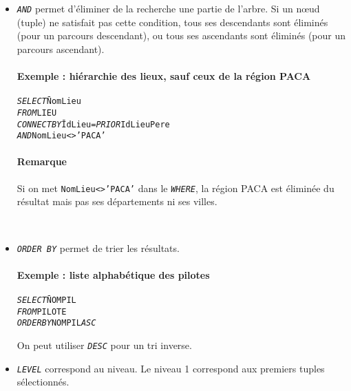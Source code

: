 \documentclass[10pt]{article}
\begin{document}
\begin{itemize}
					\item \emph{\texttt{AND}} permet d'éliminer de la recherche une partie de l'arbre. Si un nœud (tuple) ne satisfait pas cette condition, tous ses descendants sont éliminés (pour un parcours descendant), ou tous ses ascendants sont éliminés (pour un parcours ascendant).
						
						\paragraph{Exemple : hiérarchie des lieux, sauf ceux de la région PACA}
							\begin{alltt}
								\begin{tabbing}
									\emph{SELECT} \=NomLieu\\
									\emph{FROM} \>LIEU\\
									\emph{CONNECT BY} \=IdLieu=\emph{PRIOR} IdLieuPere\\
													\>\emph{AND} NomLieu<>'PACA'
								\end{tabbing}
							\end{alltt}
						\paragraph{Remarque} Si on met \texttt{NomLieu<>'PACA'} dans le \emph{\texttt{WHERE}}, la région PACA est éliminée du résultat mais pas ses départements ni ses villes.
						
						~\\
					\item \emph{\texttt{ORDER BY}} permet de trier les résultats.\index{ORDER BY}
						\paragraph{Exemple : liste alphabétique des pilotes}
							\begin{alltt}
								\begin{tabbing}
									\emph{SELECT} \=NOMPIL\\
									\emph{FROM}\>PILOTE\\
									\emph{ORDER BY} NOMPIL \emph{ASC}
								\end{tabbing}
							\end{alltt}
							
							On peut utiliser \emph{\texttt{DESC}} pour un tri inverse.
							~\\
							
					\item \emph{\texttt{LEVEL}} correspond au niveau. Le niveau 1 correspond aux premiers tuples sélectionnés.
				\end{itemize}
				
\end{document}
